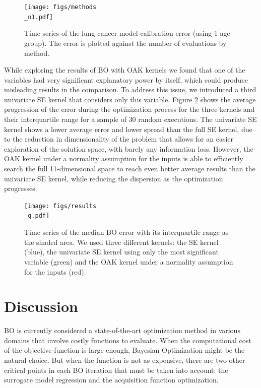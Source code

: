 \documentclass{IOS-Book-Article}
\begin{document}
	\begin{figure}[h!]
		\centering	
		\texttt{[image: figs/methods\\\_n1.pdf]}		
		\caption{Time series of the lung cancer model calibration error (using 1 age group). The error is plotted against the number of evaluations by method.}
		\label{fig:method_comparison}	
	\end{figure}
	
	While exploring the results of BO with OAK kernels we found that one of the variables had very significant explanatory power by itself, which could produce misleading results in the comparison. To address this issue, we introduced a third univariate SE kernel that considers only this variable. Figure \ref{fig:results_oak} shows the average progression of the error during the optimization process for the three kernels and their interquartile range for a sample of 30 random executions. The univariate SE kernel shows a lower average error and lower spread than the full SE kernel, due to the reduction in dimensionality of the problem that allows for an easier exploration of the solution space, with barely any information loss. However, the OAK kernel under a normality assumption for the inputs is able to efficiently search the full 11-dimensional space to reach even better average results than the univariate SE kernel, while reducing the dispersion as the optimization progresses.
	
	\begin{figure}[h!]
		\centering	
		\texttt{[image: figs/results\\\_q.pdf]}		
		\caption{Time series of the median BO error with its interquartile range as the shaded area. We used three different kernels: the SE kernel (blue), the univariate SE kernel using only the most significant variable (green) and the OAK kernel under a normality assumption for the inputs (red).}
		\label{fig:results_oak}	
	\end{figure}
	
	\section{Discussion}
	BO is currently considered a state-of-the-art optimization method in various domains that involve costly functions to evaluate. When the computational cost of the objective function is large enough, Bayesian Optimization might be the natural choice. But when the function is not as expensive, there are two other critical points in each BO iteration that must be taken into account: the surrogate model regression and the acquisition function optimization.
	
\end{document}
